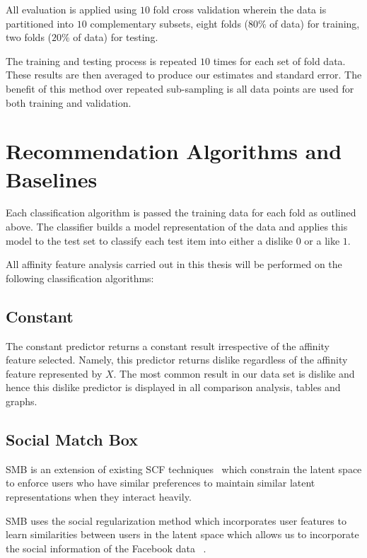 All evaluation is applied using $10$ fold cross validation wherein the data is partitioned into $10$ complementary subsets, 
eight folds ($80\%$ of data) for training, two folds ($20\%$ of data) for testing.

The training and testing process is repeated $10$ times for each set of fold data. These results are then averaged to produce our 
estimates and standard error. The benefit of this method over repeated sub-sampling is all data points are used for both training 
and validation.

\section{Recommendation Algorithms and Baselines}
\label{sec:meth}

Each classification algorithm is passed the training data for each fold as outlined above. The classifier 
builds a model representation of the data and applies this model to the test set to classify each test item into either a dislike $0$ or 
a like $1$.

All affinity feature analysis carried out in this thesis will be performed on the following classification algorithms:

\subsection{Constant}
\label{sec:const}

The constant predictor returns a constant result irrespective of the affinity feature selected. Namely, this predictor returns dislike
regardless of the affinity feature represented by $X$. The most common result in our data set is dislike and hence this dislike 
predictor is displayed in all comparison analysis, tables and graphs.

\subsection{Social Match Box}
\label{sec:sr}

SMB is an extension of existing SCF techniques~\cite{lla,socinf} which constrain the latent space to enforce users 
who have similar preferences to maintain similar latent representations when they interact heavily.

SMB uses the social regularization method which incorporates user features to learn
similarities between users in the latent space which allows us to incorporate the social information of the Facebook data ~\cite{joseph}.


